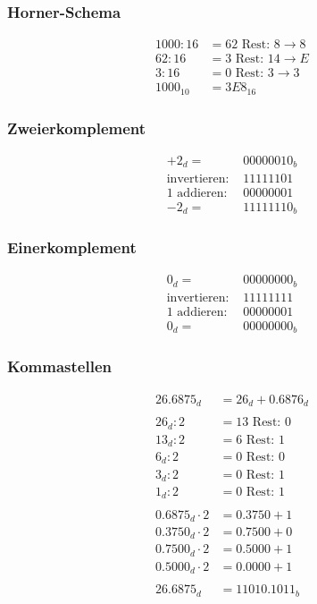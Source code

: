 \begin{minipage}[t]{0.4\linewidth}
\subsubsection*{Horner-Schema}
	\begin{align*}
		1000 : 16 &= 62 \text{ Rest: }  8 \rightarrow 8\\
		62 : 16 &=  3 \text{ Rest: } 14 \rightarrow E\\
		3 : 16 &=  0 \text{ Rest: } 3 \rightarrow 3\\
		1000_10 &= 3E8_16
	\end{align*}

\subsubsection*{Zweierkomplement}
	\begin{align*}
		+2_d = &00000010_b\\
		\text{invertieren: } &11111101 \\
		\text{1 addieren: } &00000001 \\
		-2_d = &11111110_b
	\end{align*}
	
\subsubsection*{Einerkomplement}
	\begin{align*}
		0_d = &00000000_b\\
		\text{invertieren: } &11111111 \\
		\text{1 addieren: } &00000001 \\
		0_d = &00000000_b
	\end{align*}
\end{minipage}
\hfill
\begin{minipage}[t]{0.45\linewidth}
\subsubsection*{Kommastellen}
	\begin{align*}
		26.6875_d &= 26_d + 0.6876_d \\
		\\
		26_d : 2 &= 13 \text{ Rest: } 0 \\
		13_d : 2 &= 6 \text{ Rest: } 1 \\
		6_d : 2 &= 0 \text{ Rest: } 0 \\
		3_d : 2 &= 0 \text{ Rest: } 1 \\
		1_d : 2 &= 0 \text{ Rest: } 1 \\
		\\
		0.6875_d \cdot 2 &= 0.3750 + 1 \\
		0.3750_d \cdot 2 &= 0.7500 + 0 \\
		0.7500_d \cdot 2 &= 0.5000 + 1 \\
		0.5000_d \cdot 2 &= 0.0000 + 1 \\
		\\
		26.6875_d &= 11010.1011_b
	\end{align*}
\end{minipage}

